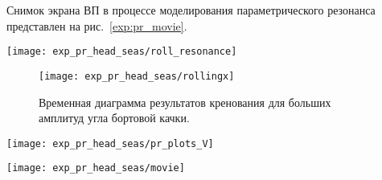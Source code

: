 Снимок экрана ВП в процессе моделирования параметрического резонанса представлен на рис.~\ref{exp:pr_movie}.

\begin{sidewaysfigure}
	\begin{center}
	\texttt{[image: exp\_pr\_head\_seas/roll\_resonance]}
	\end{center}
	\caption{График 10\%-ной обеспеченность модуля угла бортовой качки в зависимости от скорости судна.}
	\label{pr2_res}
\end{sidewaysfigure}



\begin{figure}[h!]
	\begin{center}
	\texttt{[image: exp\_pr\_head\_seas/rollingx]}
	\end{center}
	\caption{Временная диаграмма результатов кренования для больших амплитуд угла бортовой качки.}
	\label{rollingx}
\end{figure}


\begin{sidewaysfigure}
	\begin{center}
	\texttt{[image: exp\_pr\_head\_seas/pr\_plots\_V]}
	\end{center}
	\caption{Временные диаграммы качки для диапазона скоростей $6.5..9\ \text{м/с}$.}
	\label{exp_pr_rolling_resonance_head}
\end{sidewaysfigure}

\begin{sidewaysfigure}
	\begin{center}
	\texttt{[image: exp\_pr\_head\_seas/movie]}
	\end{center}
	\caption{Опасный крен вызванный параметрическим резонансом на встречной волне}
	\label{exp:pr_movie}
\end{sidewaysfigure}


